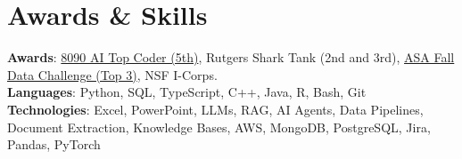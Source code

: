 \documentclass[letterpaper,11pt]{article}
\begin{document}
\section{Awards \& Skills}
 \begin{itemize}[leftmargin=0.15in, label={}]
    \small{\item{
     \textbf{Awards}{: \href{https://github.com/AkeBoss-tech/top-coder-challenge}{8090 AI Top Coder (5th)}, Rutgers Shark Tank (2nd and 3rd), \href{https://acashmoney.biz/portfolio/asa-fall-data/}{ASA Fall Data Challenge (Top 3)}, NSF I-Corps.} \\
     \textbf{Languages}{: Python, SQL, TypeScript, C++, Java, R, Bash, Git} \\
     \textbf{Technologies}{: Excel, PowerPoint, LLMs, RAG, AI Agents, Data Pipelines, Document Extraction, Knowledge Bases, AWS, MongoDB, PostgreSQL, Jira, Pandas, PyTorch}
    }}
 \end{itemize}
\end{document}
